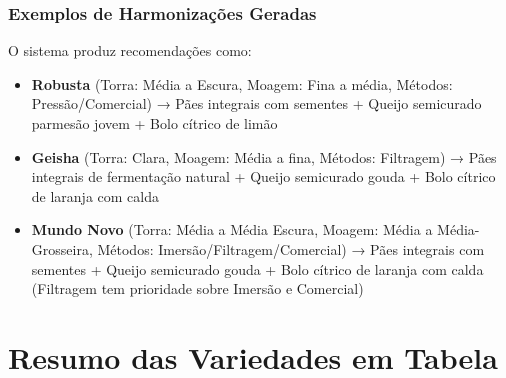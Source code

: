 \documentclass[a4paper,12pt]{article}
\begin{document}
\subsubsection{Exemplos de Harmonizações Geradas}
O sistema produz recomendações como:
\begin{itemize}
  \item \textbf{Robusta} (Torra: Média a Escura, Moagem: Fina a média, Métodos: Pressão/Comercial) → Pães integrais com sementes + Queijo semicurado parmesão jovem + Bolo cítrico de limão
  \item \textbf{Geisha} (Torra: Clara, Moagem: Média a fina, Métodos: Filtragem) → Pães integrais de fermentação natural + Queijo semicurado gouda + Bolo cítrico de laranja com calda
  \item \textbf{Mundo Novo} (Torra: Média a Média Escura, Moagem: Média a Média-Grosseira, Métodos: Imersão/Filtragem/Comercial) → Pães integrais com sementes + Queijo semicurado gouda + Bolo cítrico de laranja com calda (Filtragem tem prioridade sobre Imersão e Comercial)
\end{itemize}

\section{Resumo das Variedades em Tabela}
\end{document}
